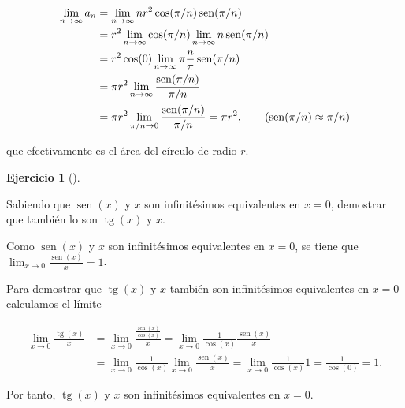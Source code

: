 \documentclass[
  a4paper,
]{scrreport}
\theoremstyle{definition}
\newtheorem{exercise}{Ejercicio}[chapter]
\theoremstyle{remark}
\begin{document}
\begin{tcolorbox}
\begin{enumerate}
  \begin{align*}
   \lim_{n\to\infty} a_n &= \lim_{n\to\infty} n r^2\cos(\pi/n)\operatorname{sen}(\pi/n)\\ 
   &= r^2 \lim_{n\to\infty}\cos(\pi/n)\lim_{n\to\infty}n\operatorname{sen}(\pi/n) \\ 
   &= r^2 \cos(0)\lim_{n\to\infty}\pi\frac{n}{\pi}\operatorname{sen}(\pi/n) \\ 
   &= \pi r^2 \lim_{n\to\infty}\frac{\operatorname{sen}(\pi/n)}{\pi/n} \\
   &= \pi r^2 \lim_{\pi/n\to 0} \frac{\operatorname{sen}(\pi/n)}{\pi/n} = \pi r^2, \tag{$\operatorname{sen}(\pi/n)\approx \pi/n$}
   \end{align*}

  que efectivamente es el área del círculo de radio \(r\).
\end{enumerate}

\end{tcolorbox}

\begin{exercise}[]\protect\hypertarget{exr-3}{}\label{exr-3}

Sabiendo que \(\operatorname{sen}(x)\) y \(x\) son infinitésimos
equivalentes en \(x=0\), demostrar que también lo son
\(\operatorname{tg}(x)\) y \(x\).

\end{exercise}

\begin{tcolorbox}[enhanced jigsaw, opacityback=0, title=\textcolor{quarto-callout-tip-color}{\faLightbulb}\hspace{0.5em}{Solución}, toptitle=1mm, colframe=quarto-callout-tip-color-frame, leftrule=.75mm, breakable, colback=white, left=2mm, bottomtitle=1mm, rightrule=.15mm, opacitybacktitle=0.6, arc=.35mm, coltitle=black, titlerule=0mm, colbacktitle=quarto-callout-tip-color!10!white, bottomrule=.15mm, toprule=.15mm]

Como \(\operatorname{sen}(x)\) y \(x\) son infinitésimos equivalentes en
\(x=0\), se tiene que
\(\lim_{x\to 0}\frac{\operatorname{sen}(x)}{x} = 1\).

Para demostrar que \(\operatorname{tg}(x)\) y \(x\) también son
infinitésimos equivalentes en \(x=0\) calculamos el límite

\begin{align*}
\lim_{x\to 0}\frac{\operatorname{tg}(x)}{x} &= \lim_{x\to 0}\frac{\frac{\operatorname{sen}(x)}{\cos(x)}}{x} = \lim_{x\to 0}\frac{1}{\cos(x)}\frac{\operatorname{sen}(x)}{x} \\
&= \lim_{x\to 0}\frac{1}{\cos(x)}\lim_{x\to 0}\frac{\operatorname{sen}(x)}{x} = \lim_{x\to 0}\frac{1}{\cos(x)} 1 = \frac{1}{\cos(0)} = 1.
\end{align*}

Por tanto, \(\operatorname{tg}(x)\) y \(x\) son infinitésimos
equivalentes en \(x=0\).

\end{tcolorbox}
\end{document}
